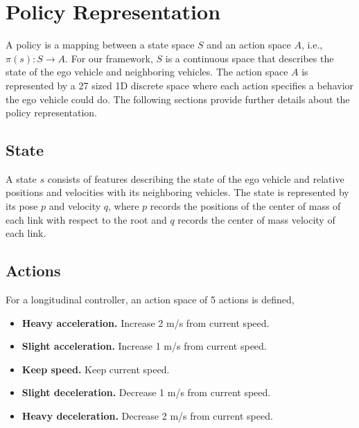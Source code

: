 \section{Policy Representation}

A policy is a mapping between a state space $S$ and an action space $A$, i.e., $\pi(s) : S \to A$. For our framework, $S$ is a continuous space that describes the state of the ego vehicle and neighboring vehicles. The action space $A$ is represented by a 27 sized 1D discrete space where each action specifies a behavior the ego vehicle could do. The following sections provide further details about the policy representation.

\subsection{State}

A state $s$ consists of features describing the state of the ego vehicle and relative positions and velocities with its neighboring vehicles. The state is represented by its pose $p$ and velocity $q$, where $p$ records the positions of the center of mass of each link with respect to the root and $q$ records the center of mass velocity of each link.

\subsection{Actions}

For a longitudinal controller, an action space of 5 actions is defined,

\begin{itemize}

    \item \textbf{Heavy acceleration.} Increase 2 m/s from current speed.
    
    \item \textbf{Slight acceleration.} Increase 1 m/s from current speed.
    
    \item \textbf{Keep speed.} Keep current speed.
    
    \item \textbf{Slight deceleration.} Decrease 1 m/s from current speed.
    
    \item \textbf{Heavy deceleration.} Decrease 2 m/s from current speed.

\end{itemize}

